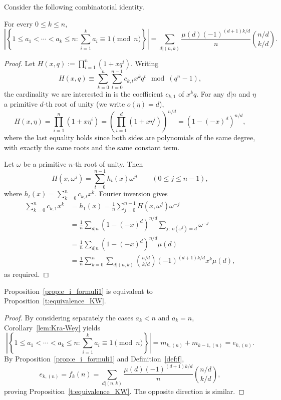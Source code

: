 \documentclass[ALCO,published]{cedram}
\begin{document}
Consider the following combinatorial identity.

\begin{proposition}\label{t:equivalence_KW}
    For every $0 \le k \le n$,
    \[
        \left| \left\{ 1 \le a_1 < \cdots < a_k \le n : \sum_{i=1}^k a_i\equiv 1 \!\!\!\!\pmod{n} \right\} \right| 
        = \sum_{d|(n,k)} \frac{\mu(d)(-1)^{(d+1)k/d}}{n} \binom{n/d}{k/d}.
    \]
\end{proposition}
	
\begin{proof}
    Let 
    $H(x,q):=\prod_{i=1}^n(1+xq^i)$. 
    Writing
    \[
        H(x,q) \equiv \sum_{k=0}^{n} \sum_{t=0}^{n-1} c_{k,t} x^kq^t \mod (q^n-1),
    \] 
    the cardinality we are interested in is the coefficient $c_{k,1}$ of $x^kq$.
    For any $d|n$ and $\eta$ a primitive $d$-th root of unity (we write $o(\eta)= d$), 
    \[
        H(x,\eta) 
        = \prod_{i=1}^n (1+x\eta^i) 
        = \left( \prod_{i=1}^d (1+x\eta^i) \right)^{n/d} 
        = (1-(-x)^d)^{n/d},
    \]
    where the last equality holds since both sides are polynomials of the same degree, with exactly the same roots and the same constant term. 
    
    Let $\omega$ be a primitive $n$-th root of unity. Then
    \[
        H(x,\omega^j) = \sum_{t=0}^{n-1} h_t(x)\omega^{jt}
        \qquad (0 \le j \le n-1),
    \]
    where $h_t(x) = \sum_{k=0}^n c_{k,t} x^k$. 
    Fourier inversion gives
    \begin{align*}
        \sum_{k=0}^{n} c_{k,1}x^k 
        &= h_1(x)
        = \frac{1}{n} \sum_{j=0}^{n-1} H(x,\omega^j) \omega^{-j} \\
        &= \frac{1}{n} \sum_{d|n}  (1-(-x)^d)^{n/d}
        \sum_{j \,:\, o(\omega^j)=d} \omega^{-j} \\
        &= \frac{1}{n} \sum_{d|n}  (1-(-x)^d)^{n/d}
        \mu(d) \\
        &= \frac{1}{n} \sum_{k=0}^{n} \sum_{d|(n,k)} \binom{n/d}{k/d} (-1)^{(d+1)k/d} x^k \mu(d),
    \end{align*}
    as required.
\end{proof}

\begin{observation}\label{prop:equiv_f_KW}
    Proposition~\ref{prop:e_i_formuli1} is equivalent to Proposition~\ref{t:equivalence_KW}.
\end{observation}

\begin{proof}
    By considering separately the cases $a_k < n$ and $a_k = n$, Corollary~\ref{lem:Kra-Wey} yields 
    \[
        \left| \left\{ 1 \le a_1 < \cdots < a_k \le n : \sum_{i=1}^k a_i \equiv 1 \!\!\!\!\pmod{n} \right\} \right|
        = m_{k,(n)} + m_{k-1,(n)} 
        = e_{k,(n)}.
    \]
    By Proposition~\ref{prop:e_i_formuli1} and Definition~\ref{def:f},
    \[
        e_{k,(n)} 
        = f_k(n)
        = \sum_{d|(n,k)} \frac{\mu(d)(-1)^{(d+1)k/d}}{n} \binom{n/d}{k/d},
    \]
    proving Proposition~\ref{t:equivalence_KW}.
    The opposite direction is similar. 
\end{proof}
    
\end{document}
